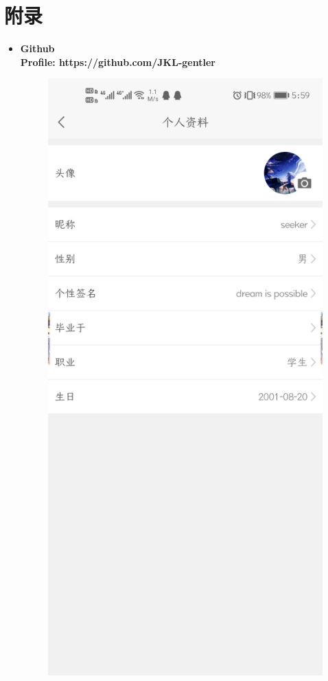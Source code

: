 \documentclass{article}
\begin{document}
\section{附录}
\begin{itemize}
    \item {
        \bf{Github}\\
        Profile: https://github.com/JKL-gentler\\
        \begin{figure}[h]
            \centering
            \includegraphics[scale=0.2]{1.3}

\end{figure}}
\end{itemize}
\end{document}

